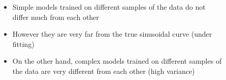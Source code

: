 \begin{frame}
\begin{columns}
\begin{column}{0.4\textwidth}
\begin{overlayarea}{\textwidth}{\textheight}
\begin{figure}
								
				\end{figure}
			\end{overlayarea}						
										
		\end{column}
		\begin{column}{0.6\textwidth}
		\begin{itemize}
			\justifying
			\setlength\itemsep{1em}
			\item<21-> Simple models trained on different samples of the data do not differ much from each other
			\item<22-> However they are very far from the true sinusoidal curve (under fitting)
												
			\item<44-> On the other hand, complex models trained on different samples of the data are very different from each other (high variance)
		\end{itemize}
		\end{column}
	\end{columns}
\end{frame}
	
